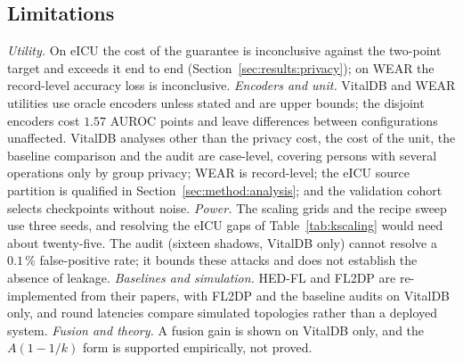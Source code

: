 \subsection{Limitations}
\emph{Utility.} On eICU the cost of the guarantee is inconclusive against the
two-point target and exceeds it end to end (Section~\ref{sec:results:privacy});
on WEAR the record-level accuracy loss is inconclusive. \emph{Encoders and
unit.} VitalDB and WEAR utilities use oracle encoders unless stated and are
upper bounds; the disjoint encoders cost $1.57$ AUROC points and leave
differences between configurations unaffected. VitalDB analyses other than the
privacy cost, the cost of the unit, the baseline comparison and the audit are
case-level, covering persons with several operations only by group privacy;
WEAR is record-level; the eICU source partition is qualified in
Section~\ref{sec:method:analysis}; and the validation cohort selects
checkpoints without noise. \emph{Power.} The scaling grids and the recipe
sweep use three seeds, and resolving the eICU gaps of
Table~\ref{tab:kscaling} would need about twenty-five. The audit (sixteen
shadows, VitalDB only) cannot resolve a $0.1\,\%$ false-positive rate; it
bounds these attacks and does not establish the absence of leakage.
\emph{Baselines and simulation.} HED-FL and FL2DP are re-implemented from their
papers, with FL2DP and the baseline audits on VitalDB only, and round
latencies compare simulated topologies rather than a deployed system.
\emph{Fusion and theory.} A fusion gain is shown on VitalDB only, and the
$A(1-1/k)$ form is supported empirically, not proved.
